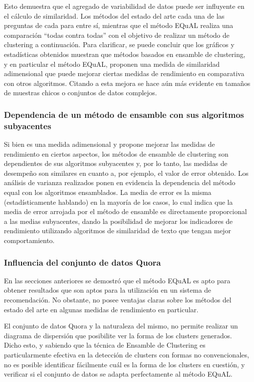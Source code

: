 \bigskip Esto demuestra que el agregado de variabilidad de datos puede ser influyente en el cálculo de similaridad. Los métodos del estado del arte cada una de las preguntas de cada para entre sí, mientras que el método EQuAL realiza una comparación “todas contra todas” con el objetivo de realizar un método de clustering a continuación. Para clarificar, se puede concluir que los gráficos y estadísticas obtenidos muestran que métodos basados en ensamble de clustering, y en particular el método EQuAL,  proponen una medida de similaridad adimensional que puede mejorar ciertas medidas de rendimiento en comparativa con otros algoritmos. Citando a \cite{fred2005combining} esta mejora se hace aún más evidente en tamaños de muestras chicos o conjuntos de datos complejos.

\subsubsection{Dependencia de un método de ensamble con sus algoritmos subyacentes}
Si bien es una medida adimensional y propone mejorar las medidas de rendimiento en ciertos aspectos, los métodos de ensamble de clustering son dependientes de sus algoritmos subyacentes y, por lo tanto, las medidas de desempeño son similares en cuanto a, por ejemplo, el valor de error obtenido. Los análisis de varianza realizados ponen en evidencia la dependencia del método equal con los algoritmos ensamblados. La media de error es la misma (estadísticamente hablando) en la mayoría de los casos, lo cual indica que la media de error arrojada por el método de ensamble es directamente proporcional a las medias subyacentes, dando la posibilidad de mejorar los indicadores de rendimiento utilizando algoritmos de similaridad de texto que tengan mejor comportamiento.

\subsubsection{Influencia del conjunto de datos Quora}
En las secciones anteriores se demostró que el método EQuAL es apto para obtener resultados que son aptos para la utilización en un sistema de recomendación. No obstante, no posee ventajas claras sobre los métodos del estado del arte en algunas medidas de rendimiento en particular.

\bigskip El conjunto de datos Quora y la naturaleza del mismo, no permite realizar un diagrama de dispersión que posibilite ver la forma de los clusters generados. Dicho esto, y sabiendo que la técnica de Ensamble de Clustering es particularmente efectiva en la detección de clusters con formas no convencionales, no es posible identificar fácilmente cuál es la forma de los clusters en cuestión, y verificar si el conjunto de datos se adapta perfectamente al método EQuAL.

